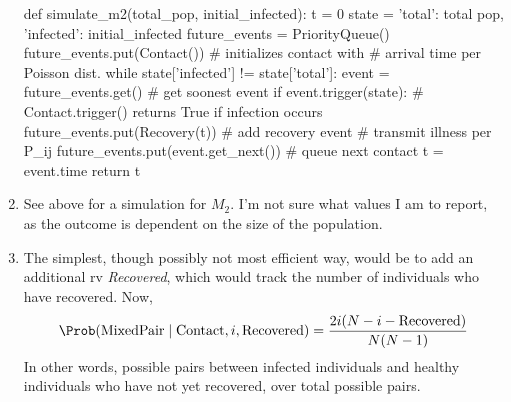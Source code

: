 \begin{solution}
\begin{enumerate}
            \begin{python}
def simulate_m2(total_pop, initial_infected):
    t = 0
    state = {'total': total pop, 'infected': initial_infected}
    future_events = PriorityQueue()
    future_events.put(Contact()) # initializes contact with 
                                 # arrival time per Poisson dist.
    while state['infected'] != state['total']:
        event = future_events.get() # get soonest event
        if event.trigger(state): 
            # Contact.trigger() returns True if infection occurs
            future_events.put(Recovery(t)) # add recovery event
        # transmit illness per P_{ij}
        future_events.put(event.get_next()) # queue next contact
        t = event.time
    return t
            \end{python}

        \item See above for a simulation for $M_2$. I'm not sure what
            values I am to report, as the outcome is dependent on the
            size of the population.

        \item The simplest, though possibly not most efficient way,
            would be to add an additional rv \emph{Recovered}, which
            would track the number of individuals who have recovered.
            Now,
            \[
                \Prob(\text{MixedPair} \mid \text{Contact}, i,
                \text{Recovered}) = 
                \frac{2i(N - i - \text{Recovered})}{N(N-1)}
            \]
            In other words, possible pairs between infected individuals
            and healthy individuals who have not yet recovered, over
            total possible pairs.

    \end{enumerate}
\end{solution}
